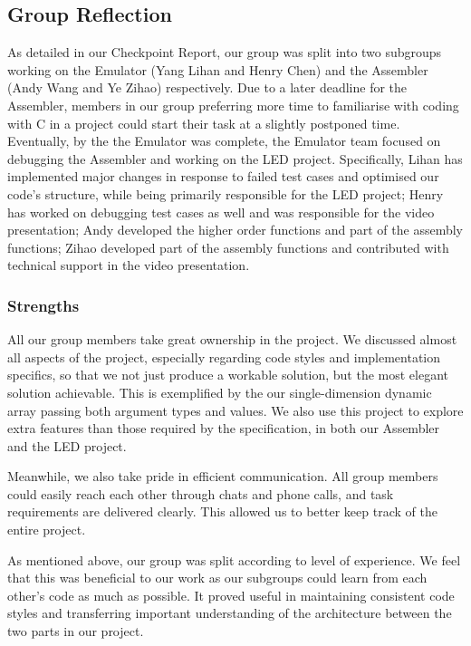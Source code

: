 \documentclass[11pt]{article}
\begin{document}
\subsection{Group Reflection}

As detailed in our Checkpoint Report, our group was split into two subgroups working on the Emulator (Yang Lihan and Henry Chen) and the Assembler (Andy Wang and Ye Zihao) respectively. Due to a later deadline for the Assembler, members in our group preferring more time to familiarise with coding with C in a project could start their task at a slightly postponed time. Eventually, by the the Emulator was complete, the Emulator team focused on debugging the Assembler and working on the LED project. Specifically, Lihan has implemented major changes in response to failed test cases and optimised our code's structure, while being primarily responsible for the LED project; Henry has worked on debugging test cases as well and was responsible for the video presentation; Andy developed the higher order functions and part of the assembly functions; Zihao developed part of the assembly functions and contributed with technical support in the video presentation.

\subsubsection{Strengths}

All our group members take great ownership in the project. We discussed almost all aspects of the project, especially regarding code styles and implementation specifics, so that we not just produce a workable solution, but the most elegant solution achievable. This is exemplified by the our single-dimension dynamic array passing both argument types and values. We also use this project to explore extra features than those required by the specification, in both our Assembler and the LED project.

Meanwhile, we also take pride in efficient communication. All group members could easily reach each other through chats and phone calls, and task requirements are delivered clearly. This allowed us to better keep track of the entire project.

As mentioned above, our group was split according to level of experience. We feel that this was beneficial to our work as our subgroups could learn from each other's code as much as possible. It proved useful in maintaining consistent code styles and transferring important understanding of the architecture between the two parts in our project.
\end{document}
